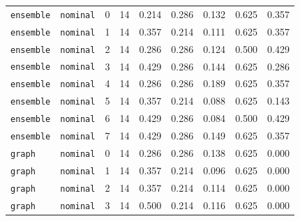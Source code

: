 \documentclass{article}
\begin{document}
\begin{center}
\begin{tabular}{llccccccc}
\texttt{ensemble} & \texttt{nominal} & 0 & 14 & 0.214 & 0.286 & 0.132 & 0.625 & 0.357 \\
\texttt{ensemble} & \texttt{nominal} & 1 & 14 & 0.357 & 0.214 & 0.111 & 0.625 & 0.357 \\
\texttt{ensemble} & \texttt{nominal} & 2 & 14 & 0.286 & 0.286 & 0.124 & 0.500 & 0.429 \\
\texttt{ensemble} & \texttt{nominal} & 3 & 14 & 0.429 & 0.286 & 0.144 & 0.625 & 0.286 \\
\texttt{ensemble} & \texttt{nominal} & 4 & 14 & 0.286 & 0.286 & 0.189 & 0.625 & 0.357 \\
\texttt{ensemble} & \texttt{nominal} & 5 & 14 & 0.357 & 0.214 & 0.088 & 0.625 & 0.143 \\
\texttt{ensemble} & \texttt{nominal} & 6 & 14 & 0.429 & 0.286 & 0.084 & 0.500 & 0.429 \\
\texttt{ensemble} & \texttt{nominal} & 7 & 14 & 0.429 & 0.286 & 0.149 & 0.625 & 0.357 \\
\texttt{graph} & \texttt{nominal} & 0 & 14 & 0.286 & 0.286 & 0.138 & 0.625 & 0.000 \\
\texttt{graph} & \texttt{nominal} & 1 & 14 & 0.357 & 0.214 & 0.096 & 0.625 & 0.000 \\
\texttt{graph} & \texttt{nominal} & 2 & 14 & 0.357 & 0.214 & 0.114 & 0.625 & 0.000 \\
\texttt{graph} & \texttt{nominal} & 3 & 14 & 0.500 & 0.214 & 0.116 & 0.625 & 0.000 \\
\bottomrule
\end{tabular}
\end{center}
\end{document}
